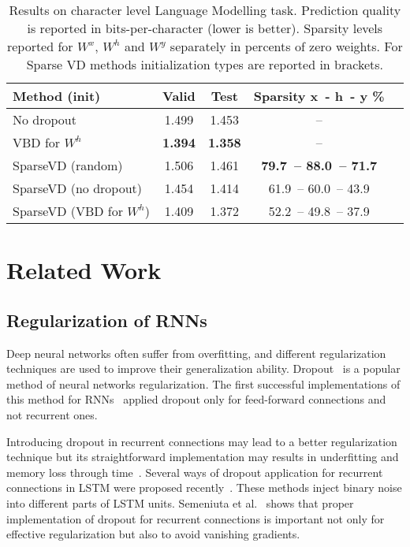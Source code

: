 \documentclass{article}
\begin{document}
\begin{table}[t]
\setlength{\tabcolsep}{4pt}
\caption{Results on character level Language Modelling task. Prediction quality is reported in bits-per-character (lower is better). Sparsity levels reported for $W^x$, $W^h$ and $W^y$ separately in percents of zero weights. For Sparse VD methods initialization types are reported in brackets.}
\label{charlm}
\vspace{-0.3cm}
\begin{center}
\begin{small}
\begin{tabular}{lcccr}
\hline
\abovespace\belowspace
Method (init) & Valid & Test & Sparsity x~- h~- y \% \\
\hline
\abovespace
No dropout    & 1.499 & 1.453 & -- \\
\belowspace
VBD for $W^h$ & {\bf 1.394} & {\bf 1.358} & --\\
\hline
\abovespace
SparseVD (random)  & 1.506& 1.461& {\bf 79.7~-- 88.0~-- 71.7}\\
SparseVD (no dropout)  & 1.454& 1.414& 61.9~-- 60.0~-- 43.9\\
\belowspace
SparseVD (VBD for $W^h$)  & 1.409 & 1.372 & 52.2~-- 49.8~-- 37.9\\
\hline
\end{tabular}
\end{small}
\end{center}
\vskip -0.15in
\end{table}

\section{Related Work}
\label{related}
\subsection{Regularization of RNNs}
Deep neural networks often suffer from overfitting, and different regularization techniques are used to improve their generalization ability. Dropout~\cite{dropout} is a popular method of neural networks regularization. The first successful implementations of this method for RNNs~\cite{pham13,zaremba14} applied dropout only for feed-forward connections and not recurrent ones. 

Introducing dropout in recurrent connections may lead to a better regularization technique but its straightforward implementation may results in underfitting and memory loss through time~\cite{semeniuta16}.  
Several ways of dropout application for recurrent connections in LSTM were proposed recently~\cite{moon15,gal,semeniuta16}. These methods inject binary noise into different parts of LSTM units. 
Semeniuta et al.~ shows that proper implementation of dropout for recurrent connections is important not only for effective regularization but also to avoid vanishing gradients.
\end{document}
